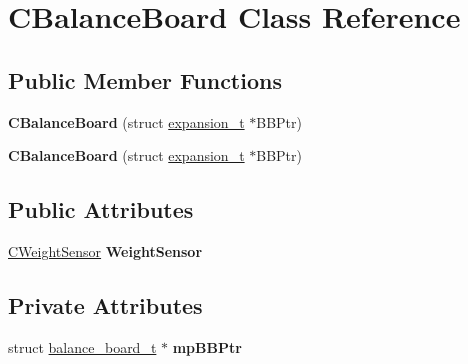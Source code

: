 \hypertarget{class_c_balance_board}{\section{C\-Balance\-Board Class Reference}
\label{class_c_balance_board}
}
\subsection*{Public Member Functions}
\begin{DoxyCompactItemize}
\item 
\hypertarget{class_c_balance_board_a11948fc65e72d912b341ebc866673c1c}{{\bfseries C\-Balance\-Board} (struct \hyperlink{structexpansion__t}{expansion\-\_\-t} $\ast$B\-B\-Ptr)}\label{class_c_balance_board_a11948fc65e72d912b341ebc866673c1c}

\item 
\hypertarget{class_c_balance_board_a11948fc65e72d912b341ebc866673c1c}{{\bfseries C\-Balance\-Board} (struct \hyperlink{structexpansion__t}{expansion\-\_\-t} $\ast$B\-B\-Ptr)}\label{class_c_balance_board_a11948fc65e72d912b341ebc866673c1c}

\end{DoxyCompactItemize}
\subsection*{Public Attributes}
\begin{DoxyCompactItemize}
\item 
\hypertarget{class_c_balance_board_a3b781ed33ad7255f557d4782728eb045}{\hyperlink{class_c_weight_sensor}{C\-Weight\-Sensor} {\bfseries Weight\-Sensor}}\label{class_c_balance_board_a3b781ed33ad7255f557d4782728eb045}

\end{DoxyCompactItemize}
\subsection*{Private Attributes}
\begin{DoxyCompactItemize}
\item 
\hypertarget{class_c_balance_board_a527d53ed2845ef951b1afe27661881c0}{struct \hyperlink{structbalance__board__t}{balance\-\_\-board\-\_\-t} $\ast$ {\bfseries mp\-B\-B\-Ptr}}\label{class_c_balance_board_a527d53ed2845ef951b1afe27661881c0}

\end{DoxyCompactItemize}


